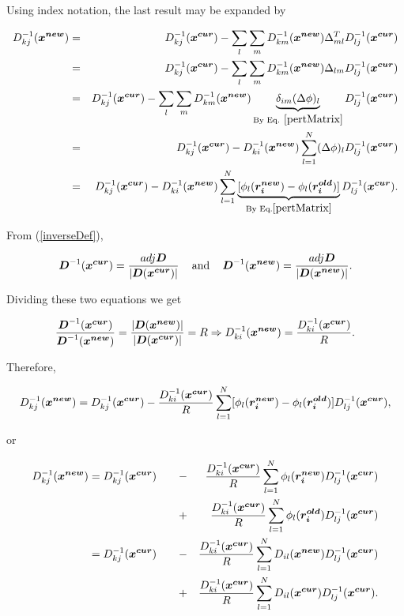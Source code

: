 Using index notation, the last result may be expanded by


\begin{eqnarray*}
D^{-1}_{kj}(\boldsymbol{x^{new}}) & = & D^{-1}_{kj}(\boldsymbol{x^{cur}}) -  \sum_{l} \sum_{m} D^{-1}_{km}(\boldsymbol{x^{new}}) \Delta^{T}_{ml}  D^{-1}_{lj}(\boldsymbol{x^{cur}})\\
& = & D^{-1}_{kj}(\boldsymbol{x^{cur}}) -  \sum_{l} \sum_{m} D^{-1}_{km}(\boldsymbol{x^{new}}) \Delta_{lm}  D^{-1}_{lj}(\boldsymbol{x^{cur}})\\
& = & D^{-1}_{kj}(\boldsymbol{x^{cur}}) -  \sum_{l} \sum_{m} D^{-1}_{km}(\boldsymbol{x^{new}}) \underbrace{\delta_{im} (\Delta \phi)_{l}}_{\text{By Eq. }\ref{pertMatrix}}  D^{-1}_{lj}(\boldsymbol{x^{cur}})\\
& = & D^{-1}_{kj}(\boldsymbol{x^{cur}}) - D^{-1}_{ki}(\boldsymbol{x^{new}}) \sum_{l=1}^{N}(\Delta \phi)_{l}  D^{-1}_{lj}(\boldsymbol{x^{cur}})\\
& = & D^{-1}_{kj}(\boldsymbol{x^{cur}}) - D^{-1}_{ki}(\boldsymbol{x^{new}}) \sum_{l=1}^{N}\underbrace{[\phi_{l}(\boldsymbol{r_{i}^{new}}) - \phi_{l}(\boldsymbol{r_{i}^{old}})]}_{\text{By Eq.}\ref{pertMatrix}}  D^{-1}_{lj}(\boldsymbol{x^{cur}}).
\end{eqnarray*}

From (\ref{inverseDef}), 

$$\boldsymbol{D}^{-1}(\boldsymbol{x^{cur}}) = \frac{adj \boldsymbol{D}}{|\boldsymbol{D}(\boldsymbol{x^{cur}})|} \, \quad \text{and} \, \quad \boldsymbol{D}^{-1}(\boldsymbol{x^{new}}) = \frac{adj \boldsymbol{D}}{|\boldsymbol{D}(\boldsymbol{x^{new}})|}.$$

Dividing these two equations we get

$$\frac{\boldsymbol{D}^{-1}(\boldsymbol{x^{cur}})}{\boldsymbol{D}^{-1}(\boldsymbol{x^{new}})} = \frac{|\boldsymbol{D}(\boldsymbol{x^{new}})|}{|\boldsymbol{D}(\boldsymbol{x^{cur}})|} = R \Rightarrow D^{-1}_{ki}(\boldsymbol{x^{new}}) = \frac{D^{-1}_{ki}(\boldsymbol{x^{cur}})}{R}.$$

Therefore,

$$D^{-1}_{kj}(\boldsymbol{x^{new}})  =  D^{-1}_{kj}(\boldsymbol{x^{cur}}) - \frac{D^{-1}_{ki}(\boldsymbol{x^{cur}})}{R} \sum_{l=1}^{N}[\phi_{l}(\boldsymbol{r_{i}^{new}}) - \phi_{l}(\boldsymbol{r_{i}^{old}})]  D^{-1}_{lj}(\boldsymbol{x^{cur}}),$$

or

\begin{align}
 D^{-1}_{kj}(\boldsymbol{x^{new}})  =  D^{-1}_{kj}(\boldsymbol{x^{cur}}) \qquad & - & \frac{D^{-1}_{ki}(\boldsymbol{x^{cur}})}{R} \sum_{l=1}^{N}\phi_{l}(\boldsymbol{r_{i}^{new}})  D^{-1}_{lj}(\boldsymbol{x^{cur}}) \nonumber\\
  & + &  \frac{D^{-1}_{ki}(\boldsymbol{x^{cur}})}{R} \sum_{l=1}^{N}\phi_{l}(\boldsymbol{r_{i}^{old}})  D^{-1}_{lj}(\boldsymbol{x^{cur}})\nonumber\\
                             =  D^{-1}_{kj}(\boldsymbol{x^{cur}}) \qquad & - & \frac{D^{-1}_{ki}(\boldsymbol{x^{cur}})}{R} \sum_{l=1}^{N} D_{il}(\boldsymbol{x^{new}})  D^{-1}_{lj}(\boldsymbol{x^{cur}}) \nonumber\\
& + &  \frac{D^{-1}_{ki}(\boldsymbol{x^{cur}})}{R} \sum_{l=1}^{N} D_{il}(\boldsymbol{x^{cur}}) D^{-1}_{lj}(\boldsymbol{x^{cur}}).\nonumber
\end{align}

